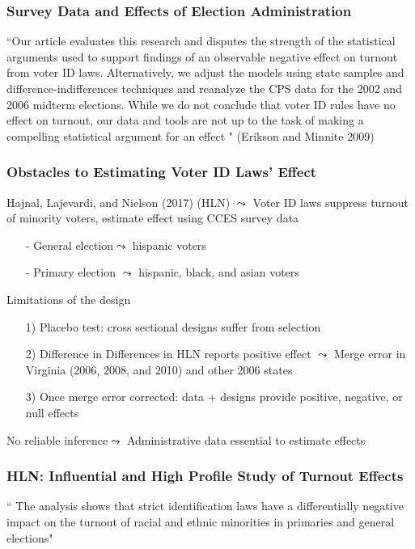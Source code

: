 \documentclass{beamer}
\numberwithin{equation}{section}
\begin{document}
\begin{frame}
\frametitle{Survey Data and Effects of Election Administration}

``Our article evaluates
this research and disputes the strength of
the statistical arguments used to support findings
of an observable negative effect on turnout
from voter ID laws. Alternatively, we adjust the
models using state samples and difference-indifferences
techniques and reanalyze the CPS
data for the 2002 and 2006 midterm elections.
While we do not conclude that voter ID rules
have no effect on turnout, \alert{our data and tools
are not up to the task of making a compelling
statistical argument for an effect} " (Erikson and Minnite 2009)


\end{frame}


\begin{frame}
\frametitle{Obstacles to Estimating Voter ID Laws' Effect}

Hajnal, Lajevardi, and Nielson (2017) (HLN) $\leadsto$ Voter ID laws suppress turnout of minority voters, estimate effect using CCES survey data
\begin{itemize}
  \item[-] General election$\leadsto$ hispanic voters
  \item[-] Primary election $\leadsto$ hispanic, black, and asian voters
\end{itemize}

Limitations of the design
\begin{itemize}
  \item[1)] Placebo test: cross sectional designs suffer from selection 
  \item[2)] Difference in Differences in HLN reports positive effect $\leadsto$ Merge error in Virginia (2006, 2008, and 2010) and other 2006 states
  \item[3)] Once merge error corrected: data + designs provide positive, negative, or null effects
\end{itemize} 

\alert{No reliable inference$\leadsto$ Administrative data essential to estimate effects}
\end{frame}


\begin{frame}
\frametitle{HLN: Influential and High Profile Study of Turnout Effects}


\huge
`` The analysis shows that strict identification laws have a differentially
negative impact on the turnout of racial and ethnic minorities in primaries and general elections"

\end{frame}
\end{document}
